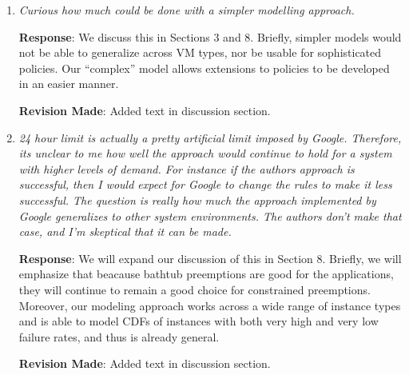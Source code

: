 \documentclass{article}
\newcommand{\resp}[1]{\textbf{Response}: #1}
\newcommand{\revmade}[1]{\textbf{Revision Made}: #1}
\begin{document}
\begin{enumerate}

\item \emph{Curious how much could be done with a simpler modelling approach.}

\resp{We discuss this in Sections 3 and 8. Briefly, simpler models would not be able to generalize across VM types, nor be usable for sophisticated policies. Our ``complex'' model allows extensions to policies to be developed in an easier manner.}


\revmade{Added text in discussion section.}

\item \emph{24 hour limit is actually a pretty artificial limit imposed by Google. Therefore, its unclear to me how well the approach would continue to hold for a system with higher levels of demand. For instance if the authors approach is successful, then I would expect for Google to change the rules to make it less successful. The question is really how much the approach implemented by Google generalizes to other system environments. The authors don't make that case, and I'm skeptical that it can be made.}

\resp{We will expand our discussion of this in Section 8. Briefly, we will emphasize that  beacause bathtub preemptions are good for the applications, they will continue to remain a good choice for constrained preemptions. Moreover, our modeling approach works across a wide range of instance types and is able to model CDFs of instances with both very high and very low failure rates, and thus is already general. }


\revmade{Added text in discussion section.}

\end{enumerate}
\end{document}
